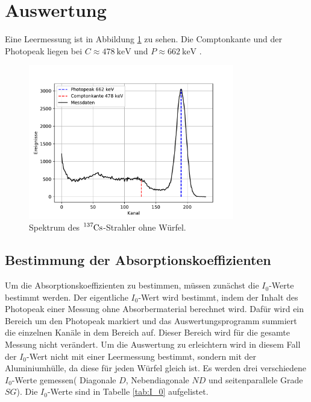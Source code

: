 \section{Auswertung}
\label{sec:Auswertung}

Eine Leermessung ist in Abbildung \ref{fig:Leer} zu sehen. Die Comptonkante und der Photopeak liegen bei $C\approx \SI{478}{\kilo\eV}$ und 
$P\approx\SI{662}{\kilo\eV}$ \cite{Lit_Wert_Comp}.

\begin{figure}
    \centering
    \includegraphics[width=0.8\textwidth]{figure/Leer.pdf}
    \caption{Spektrum des $\ce{^137Cs}$-Strahler ohne Würfel.}
    \label{fig:Leer}
\end{figure}

\subsection{Bestimmung der Absorptionskoeffizienten}

Um die Absorptionskoeffizienten zu bestimmen, müssen zunächst die $I_0$-Werte bestimmt werden. 
Der eigentliche $I_0$-Wert wird bestimmt, indem der Inhalt des Photopeak einer Messung ohne 
Absorbermaterial berechnet wird. Dafür wird ein Bereich um den Photopeak markiert und das Auswertungsprogramm summiert die einzelnen 
Kanäle in dem Bereich auf.
Dieser Bereich wird für die gesamte Messung nicht verändert. Um die Auswertung zu erleichtern wird in diesem Fall
der $I_0$-Wert nicht mit einer Leermessung bestimmt, sondern mit der Aluminiumhülle, da diese für jeden 
Würfel gleich ist. Es werden drei 
verschiedene $I_0$-Werte gemessen( Diagonale $D$, Nebendiagonale $ND$ und seitenparallele Grade $SG$).
Die $I_0$-Werte sind in Tabelle \ref{tab:I_0} aufgelistet.


